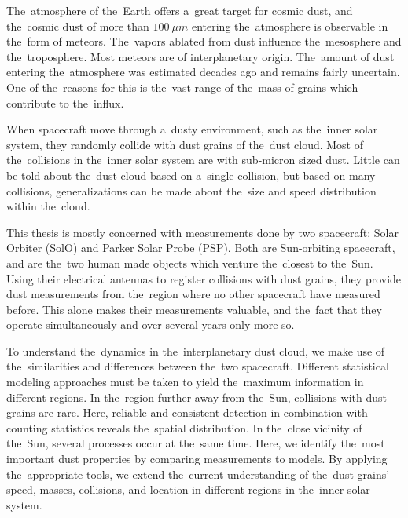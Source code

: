 The~atmosphere of the~Earth offers a~great target for cosmic dust, and the~cosmic dust of more than $\SI{100}{\mu m}$ entering the~atmosphere is observable in the~form of meteors. The~vapors ablated from dust influence the~mesosphere and the~troposphere. Most meteors are of interplanetary origin. The~amount of dust entering the~atmosphere was estimated decades ago and remains fairly uncertain. One of the~reasons for this is the~vast range of the~mass of grains which contribute to the~influx.

When spacecraft move through a~dusty environment, such as the~inner solar system, they randomly collide with dust grains of the~dust cloud. Most of the~collisions in the~inner solar system are with sub-micron sized dust. Little can be told about the~dust cloud based on a~single collision, but based on many collisions, generalizations can be made about the~size and speed distribution within the~cloud. 

This thesis is mostly concerned with measurements done by two spacecraft: Solar Orbiter (SolO) and Parker Solar Probe (PSP). Both are Sun-orbiting spacecraft, and are the~two human made objects which venture the~closest to the~Sun. Using their electrical antennas to register collisions with dust grains, they provide dust measurements from the~region where no other spacecraft have measured before. This alone makes their measurements valuable, and the~fact that they operate simultaneously and over several years only more so.

To understand the~dynamics in the~interplanetary dust cloud, we make use of the~similarities and differences between the~two spacecraft. Different statistical modeling approaches must be taken to yield the~maximum information in different regions. In the~region further away from the~Sun, collisions with dust grains are rare. Here, reliable and consistent detection in combination with counting statistics reveals the~spatial distribution. In the~close vicinity of the~Sun, several processes occur at the~same time. Here, we identify the~most important dust properties by comparing measurements to models. By applying the~appropriate tools, we extend the~current understanding of the~dust grains' speed, masses, collisions, and location in different regions in the~inner solar system.


